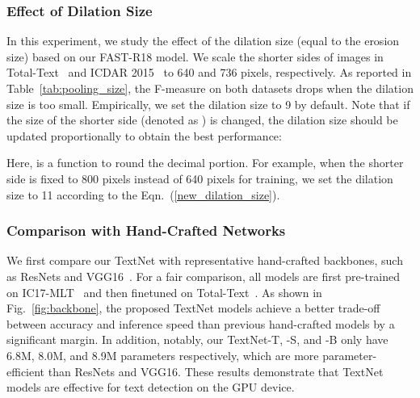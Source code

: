 \documentclass[lettersize,journal]{IEEEtran}
\begin{document}
\subsubsection{Effect of Dilation Size}
In this experiment, we study the effect of the dilation size  (equal to the erosion size) based on our FAST-R18 model.
We scale the shorter sides of images in Total-Text~\cite{ch2017total} and ICDAR 2015~\cite{karatzas2015icdar} to 640 and 736 pixels, respectively.
As reported in Table~\ref{tab:pooling_size}, the F-measure on both datasets drops when the dilation size is too small.
Empirically, we set the dilation size  to 9 by default. 
Note that if the size of the shorter side (denoted as ) is changed, the dilation size  should be updated proportionally to obtain the best performance:

Here,  is a function to round the decimal portion.
For example, when the shorter side is fixed to 800 pixels instead of 640 pixels for training, we set the dilation size  to 11 according to the Eqn.~(\ref{new_dilation_size}). 





\subsubsection{Comparison with Hand-Crafted Networks}
We first compare our TextNet with representative hand-crafted backbones, such as ResNets \cite{he2016deep} and VGG16~\cite{simonyan2014very}.
For a fair comparison, all models are first pre-trained on IC17-MLT~\cite{nayef2017icdar2017} and then finetuned on Total-Text~\cite{ch2017total}.
As shown in Fig.~\ref{fig:backbone}, the proposed TextNet models achieve a better trade-off between accuracy and inference speed than previous hand-crafted models by a significant margin.
In addition, notably, our TextNet-T, -S, and -B only have 6.8M, 8.0M, and 8.9M parameters respectively, which are more parameter-efficient than ResNets and VGG16. 
These results demonstrate that TextNet models are effective for text detection on the GPU device. 
\end{document}
